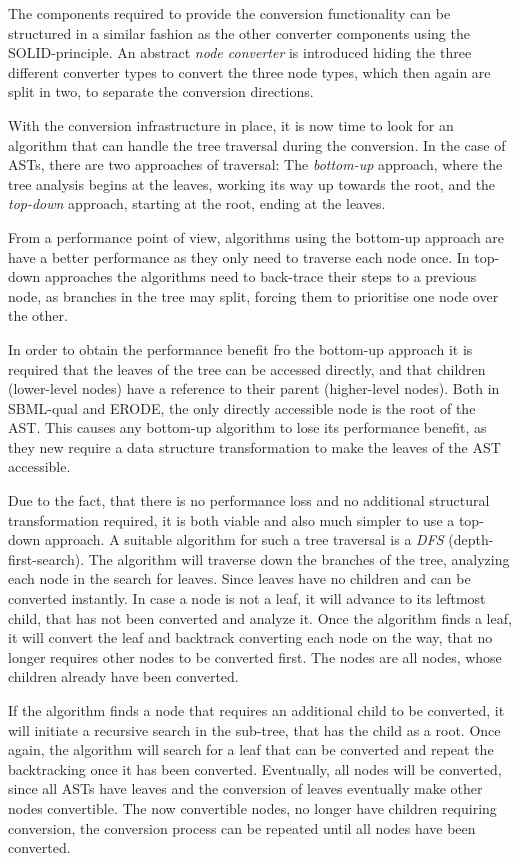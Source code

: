 The components required to provide the conversion functionality can be structured in a similar fashion as the other converter components using the SOLID-principle. An abstract \emph{node converter} is introduced hiding the three different converter types to convert the three node types, which then again are split in two, to separate the conversion directions.

With the conversion infrastructure in place, it is now time to look for an algorithm that can handle the tree traversal during the conversion. In the case of ASTs, there are two approaches of traversal: The \emph{bottom-up} approach, where the tree analysis begins at the leaves, working its way up towards the root, and the \emph{top-down} approach, starting at the root, ending at the leaves.

From a performance point of view, algorithms using the bottom-up approach are have a better performance as they only need to traverse each node once. In top-down approaches the algorithms need to back-trace their steps to a previous node, as branches in the tree may split, forcing them to prioritise one node over the other.

In order to obtain the performance benefit fro the bottom-up approach it is required that the leaves of the tree can be accessed directly, and that children (lower-level nodes) have a reference to their parent (higher-level nodes). Both in SBML-qual and ERODE, the only directly accessible node is the root of the AST. This causes any bottom-up algorithm to lose its performance benefit, as they new require a data structure transformation to make the leaves of the AST accessible.

Due to the fact, that there is no performance loss and no additional structural transformation required, it is both viable and also much simpler to use a top-down approach. A suitable algorithm for such a tree traversal is a \emph{DFS} (depth-first-search). The algorithm will traverse down the branches of the tree, analyzing each node in the search for leaves. Since leaves have no children and can be converted instantly. In case a node is not a leaf, it will advance to its leftmost child, that has not been converted and analyze it. Once the algorithm finds a leaf, it will convert the leaf and backtrack converting each node on the way, that no longer requires other nodes to be converted first. The nodes are all nodes, whose children already have been converted.

If the algorithm finds a node that requires an additional child to be converted, it will initiate a recursive search in the sub-tree, that has the child as a root. Once again, the algorithm will search for a leaf that can be converted and repeat the backtracking once it has been converted.
Eventually, all nodes will be converted, since all ASTs have leaves and the conversion of leaves eventually make other nodes convertible. The now convertible nodes, no longer have children requiring conversion, the conversion process can be repeated until all nodes have been converted.


